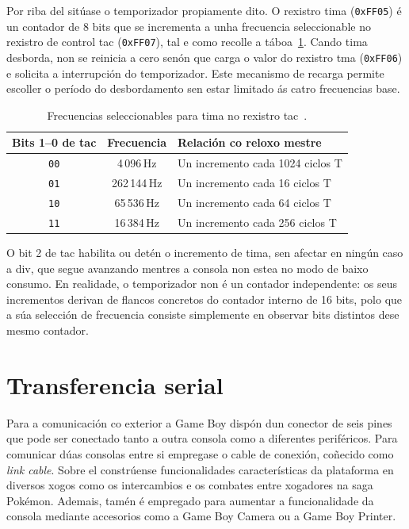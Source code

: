 Por riba del sitúase o temporizador propiamente dito.
O rexistro \acrfull{tima} (\texttt{0xFF05}) é un contador de 8 bits que se incrementa a unha
frecuencia seleccionable no rexistro de control \acrfull{tac} (\texttt{0xFF07}), tal e como
recolle a táboa~\ref{tab:tac}. Cando \acrshort{tima} desborda, non se reinicia a cero senón
que carga o valor do rexistro \acrfull{tma} (\texttt{0xFF06}) e solicita a interrupción do
temporizador. Este mecanismo de recarga permite escoller o período do desbordamento sen
estar limitado ás catro frecuencias base.

\begin{table}[htbp]
  \centering
  \begin{tabular}{c|c|l}
  \rowcolor{udcpink!25}
  \textbf{Bits 1--0 de \acrshort{tac}} & \textbf{Frecuencia} & \textbf{Relación co reloxo mestre} \\\hline
  \texttt{00} & 4\,096\,Hz   & Un incremento cada 1024 ciclos T \\
  \texttt{01} & 262\,144\,Hz & Un incremento cada 16 ciclos T \\
  \texttt{10} & 65\,536\,Hz  & Un incremento cada 64 ciclos T \\
  \texttt{11} & 16\,384\,Hz  & Un incremento cada 256 ciclos T \\
  \end{tabular}
  \caption{Frecuencias seleccionables para \acrshort{tima} no rexistro \acrshort{tac}~\cite{pandocs}.}
  \label{tab:tac}
\end{table}

O bit 2 de \acrshort{tac} habilita ou detén o incremento de \acrshort{tima}, sen afectar en
ningún caso a \acrshort{div}, que segue avanzando mentres a consola non estea no modo de
baixo consumo.
En realidade, o temporizador non é un contador independente: os seus incrementos derivan
de flancos concretos do contador interno de 16 bits, polo que a súa selección de frecuencia
consiste simplemente en observar bits distintos dese mesmo contador.


\section{Transferencia serial}
\label{sec:serial}

Para a comunicación co exterior a Game Boy dispón dun conector de seis pines
que pode ser conectado tanto a outra consola como a diferentes periféricos.
Para comunicar dúas consolas entre si
empregase o cable de conexión, coñecido como \textit{link cable}.
Sobre el constrúense funcionalidades características da plataforma
en diversos xogos como os intercambios e os combates entre xogadores na saga Pokémon.
Ademais, tamén é empregado para aumentar a funcionalidade da consola mediante
accesorios como a Game Boy Camera ou a Game Boy Printer.

